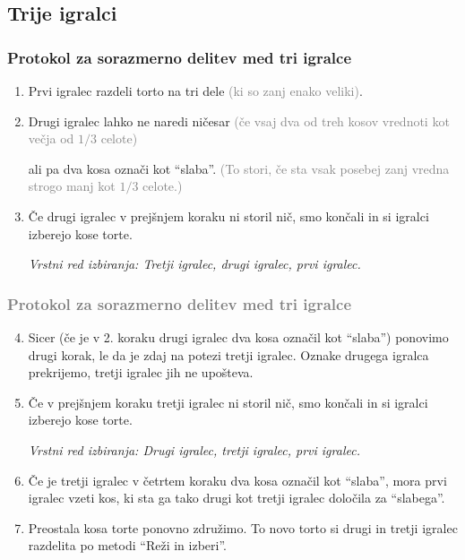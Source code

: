 \documentclass{beamer}
\begin{document}
\subsection{Trije igralci}
\begin{frame}


\frametitle{Protokol za sorazmerno delitev med tri igralce}
\begin{enumerate}

\item Prvi igralec razdeli torto na tri dele \textcolor{gray}{(ki so zanj enako veliki)}.

\item Drugi igralec lahko ne naredi ničesar \textcolor{gray}{(če vsaj dva od treh kosov vrednoti kot večja od $1/3$ celote)}

ali pa dva kosa označi kot ``slaba''. \textcolor{gray}{(To stori, če sta vsak posebej zanj vredna strogo manj kot $1/3$ celote.)}

\item Če drugi igralec v prejšnjem koraku ni storil nič, smo končali in si igralci izberejo kose torte.

\textsl{Vrstni red izbiranja: Tretji igralec, drugi igralec, prvi igralec.}

\end{enumerate}
\end{frame}
\begin{frame}
\frametitle{\textcolor{gray}{Protokol za sorazmerno delitev med tri igralce}}
\begin{enumerate}
\setcounter{enumi}{3}

\item Sicer (če je v 2. koraku drugi igralec dva kosa označil kot ``slaba'') ponovimo drugi korak, le da je zdaj na potezi tretji igralec. Oznake drugega igralca prekrijemo, tretji igralec jih ne upošteva.

\item Če v prejšnjem koraku tretji igralec ni storil nič, smo končali in si igralci izberejo kose torte.

\textsl{Vrstni red izbiranja: Drugi igralec, tretji igralec, prvi igralec.}


\item Če je tretji igralec v četrtem koraku dva kosa označil kot ``slaba'', mora prvi igralec vzeti kos, ki sta ga tako drugi kot tretji igralec določila za ``slabega''.

\item Preostala kosa torte ponovno združimo. To novo torto si drugi in tretji igralec razdelita po metodi ``Reži in izberi''.

\end{enumerate}

\end{frame}
\end{document}
